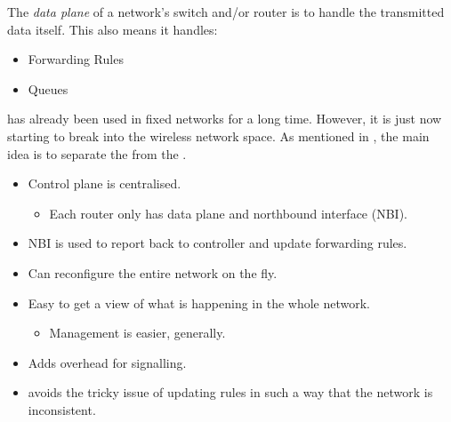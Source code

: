 \begin{definition}\label{def:Data_Plane}
  The \emph{data plane} of a network's switch and/or router is to handle the transmitted data itself.
  This also means it handles:
  \begin{itemize}[noitemsep]
  \item Forwarding Rules
  \item Queues
  \end{itemize}
\end{definition}

 has already been used in fixed networks for a long time.
However, it is just now starting to break into the wireless network space.
As mentioned in , the main idea is to separate the  from the .
\begin{itemize}[noitemsep]
\item Control plane is centralised.
  \begin{itemize}[noitemsep]
  \item Each router only has data plane and northbound interface (NBI).
\end{itemize}
\item NBI is used to report back to controller and update forwarding rules.
\item Can reconfigure the entire network on the fly.
\item Easy to get a view of what is happening in the whole network.
  \begin{itemize}[noitemsep]
  \item Management is easier, generally.
\end{itemize}
\item Adds overhead for signalling.
\item {} avoids the tricky issue of updating rules in such a way that the network is inconsistent.
\end{itemize}

